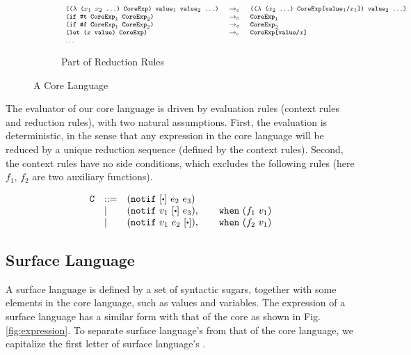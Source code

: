 \begin{figure*}[t]
\begin{subfigure}{0.99\linewidth}
	\[
{\footnotesize
		\begin{array}{lcl}
		\texttt{(($\lambda$~($x_1$~$x_2$~...)~CoreExp)~$\mbox{\tt value}_1$~$\mbox{\tt value}_2$~...)} &~\rightarrow_c~& \texttt{(($\lambda$~($x_2$~...)~CoreExp[$\mbox{\tt value}_1$/$x_1$])~$\mbox{\tt value}_2$~...)}\\

		\texttt{(if~$\mbox{\tt \#t}$~$\mbox{\tt CoreExp}_1$~$\mbox{\tt CoreExp}_2$)}&~\rightarrow_c~& \texttt{$\mbox{\tt CoreExp}_1$}\\
		\texttt{(if~$\mbox{\tt \#f}$~$\mbox{\tt CoreExp}_1$~$\mbox{\tt CoreExp}_2$)}&~\rightarrow_c~& \texttt{$\mbox{\tt CoreExp}_2$}\\
		\texttt{(let~($x$~$\mbox{\tt value}$)~CoreExp)}&~\rightarrow_c~&\texttt{CoreExp[\mbox{\tt value}/$x$]}\\
		\ldots&&
		\end{array}
}
\]
	\caption{Part of Reduction Rules}
\end{subfigure}

\caption{A Core Language}
\label{fig:core}
\end{figure*}

The evaluator of our core language is driven by evaluation rules (context rules and reduction rules), with two natural assumptions. First, the evaluation is deterministic, in the sense that any expression in the core language will be reduced by a unique reduction sequence (defined by the context rules). Second, the context rules have no side conditions, which excludes the following rules (here $f_1$, $f_2$ are two auxiliary functions).

{\footnotesize
\[
\begin{array}{lll}
\m{C}& ::= & (\m{notif}~[\bigcdot]~e_2~e_3)\\
&|& (\m{notif}~v_1~[\bigcdot]~e_3), \qquad \m{when}~(f_1~v_1)\\
&|& (\m{notif}~v_1~e_2~[\bigcdot]), \qquad \m{when}~(f_2~v_1)
\end{array}
\]}


\subsection{Surface Language}
\label{mark:suflang}

A surface language is defined by a set of syntactic sugars, together with some elements in the core language, such as values and variables. The expression of a surface language has a similar form with that of the core as shown in Fig.  \ref{fig:expression}. To separate surface language's  from that of the core language, we capitalize the first letter of surface language's .


